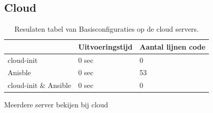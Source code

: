 \subsection{Cloud}

\begin{table}[!htb]
	\centering
	\begin{tabular}{| l | l | l |}
		\hline
		& \textbf{Uitvoeringstijd} & \textbf{Aantal lijnen code}  \\ \hline
		cloud-init & 0 sec & 0 \\ \hline
		Anisble & 0 sec & 53 \\ \hline
		cloud-init \& Ansible & 0 sec & 0 \\
		\hline
	\end{tabular}
	\caption{Resulaten tabel van Basisconfiguraties op de cloud servers.}
	\label{tab:tabel cloud resultaten basis}
\end{table}

Meerdere server bekijen bij cloud
